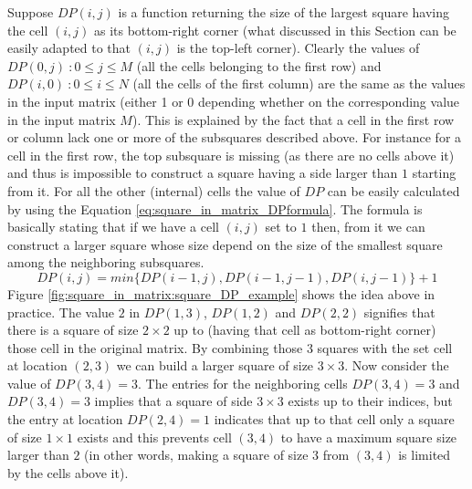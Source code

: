 Suppose $DP(i,j)$ is a function returning the size of the largest square having the cell $(i,j)$ as
its bottom-right corner (what discussed in this Section can be easily adapted to that $(i,j)$ is the
top-left corner). Clearly the values of $DP(0,j) \: : 0 \leq j \leq M$ (all the cells belonging to
the first row) and $DP(i,0) \: : 0 \leq i \leq N$ (all the cells of the first column) are the same
as the values in the input matrix (either 1 or 0 depending whether on the corresponding value in the
input matrix $M$). This is explained by the fact that a cell in the first row or column lack one or
more of the subsquares described above. For instance for a cell in the first row, the top subsquare
is missing (as there are no cells above it) and thus is impossible to construct a square having a
side larger than $1$ starting from it. For all the other (internal) cells the value of $DP$ can be
easily calculated by using the Equation \ref{eq:square_in_matrix_DPformula}. The formula is
basically stating that if we have a cell $(i,j)$ set to $1$ then, from it we can construct a larger
square whose size depend on the size of the smallest square among the neighboring subsquares.
\begin{equation}
	\label{eq:square_in_matrix_DPformula}
	DP(i,j) = min\{DP(i-1,j),DP(i-1,j-1), DP(i,j-1)\} +1
\end{equation}
Figure \ref{fig:square_in_matrix:square_DP_example} shows the idea above in practice. The value $2$
in $DP(1,3)$, $DP(1,2)$ and $DP(2,2)$ signifies that there is a square of size $2\times 2$ up to
(having that cell as bottom-right corner) those cell in the original matrix. By combining those $3$
squares with the set cell at location $(2,3)$ we can build a larger square of size $3\times 3$. Now
consider the value of $DP(3,4)=3$. The entries for the neighboring cells $DP(3,4)=3$ and $DP(3,4)=3$
implies that a square of side $3\times 3$ exists up to their indices, but the entry at location
$DP(2,4)=1$ indicates that up to that cell only a square of size $1\times 1$ exists and this
prevents cell $(3,4)$ to have a maximum square size larger than $2$ (in other words, making a square
of size $3$ from $(3,4)$ is limited by the cells above it).

